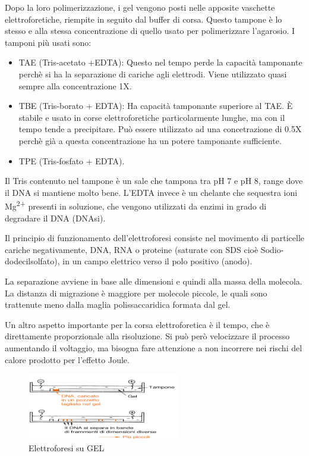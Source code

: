 Dopo la loro polimerizzazione, i gel vengono posti nelle apposite vaschette elettroforetiche,
riempite in seguito dal buffer di corsa.
Questo tampone è lo stesso e alla stessa concentrazione di quello usato per polimerizzare l'agarosio.
\vspace{0.3cm}
I tamponi più usati sono:
\begin{itemize}

\item{TAE (Tris-acetato +EDTA): }
Questo nel tempo perde la capacità tamponante perchè si ha la separazione
di cariche agli elettrodi. Viene utilizzato quasi sempre alla concentrazione 1X.

\item{TBE (Tris-borato + EDTA):}
Ha capacità tamponante superiore al TAE.
\`E stabile e usato in corse elettroforetiche particolarmente lunghe,
ma con il tempo tende a precipitare.
Può essere utilizzato ad una concetrazione di 0.5X perchè già a questa
concentrazione ha un potere tamponante sufficiente.

\item{TPE (Tris-fosfato + EDTA).}

 \end{itemize}

Il Tris contenuto nel tampone è un sale che tampona tra pH 7 e pH 8, range dove il DNA
si mantiene molto bene. L'EDTA invece è un chelante che sequestra ioni Mg\textsuperscript{2+}
presenti in soluzione, che vengono utilizzati da enzimi in grado di degradare il DNA (DNAsi).

Il principio di funzionamento dell'elettroforesi consiste nel movimento di particelle
cariche negativamente, DNA, RNA o proteine (saturate con SDS cioè Sodio-dodecilsolfato),
in un campo elettrico verso il polo positivo (anodo).

La separazione avviene in base alle dimensioni e quindi alla massa della molecola.
La distanza di migrazione è maggiore per molecole piccole, le quali sono trattenute meno dalla maglia
polissaccaridica formata dal gel.

Un altro aspetto importante per la corsa elettroforetica è il tempo,
che è direttamente proporzionale alla risoluzione. Si può però velocizzare il processo
aumentando il voltaggio, ma bisogna fare attenzione a non incorrere nei rischi del
calore prodotto per l'effetto Joule.

\begin{figure}[H]

	\centering
	\includegraphics[width=0.6\textwidth]{./immagini/elettroforesi.png}
	\caption{Elettroforesi su GEL}
	\label{elettroforesi}

\end{figure}

